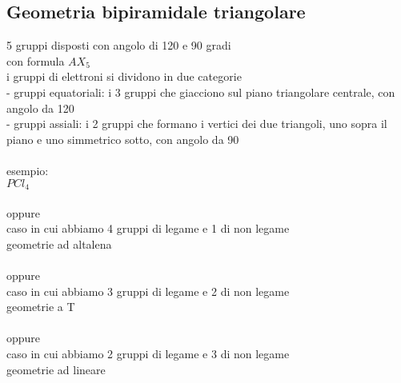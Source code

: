 \subsection{Geometria bipiramidale triangolare}
5 gruppi disposti con angolo di 120 e 90 gradi \\
con formula $AX_5$\\
i gruppi di elettroni si dividono in due categorie\\
\tab- gruppi equatoriali: i 3 gruppi che giacciono sul piano triangolare centrale, con angolo da 120\\
\tab- gruppi assiali: i 2 gruppi che formano i vertici dei due triangoli, uno sopra il piano e uno simmetrico sotto, con angolo da 90\\\\
esempio:\\
$PCl_4$\\\\
oppure \\
caso in cui abbiamo 4 gruppi di legame e 1 di non legame\\
geometrie ad altalena\\\\
oppure \\
caso in cui abbiamo 3 gruppi di legame e 2 di non legame\\
geometrie a T\\\\
oppure \\
caso in cui abbiamo 2 gruppi di legame e 3 di non legame\\
geometrie ad lineare\\
